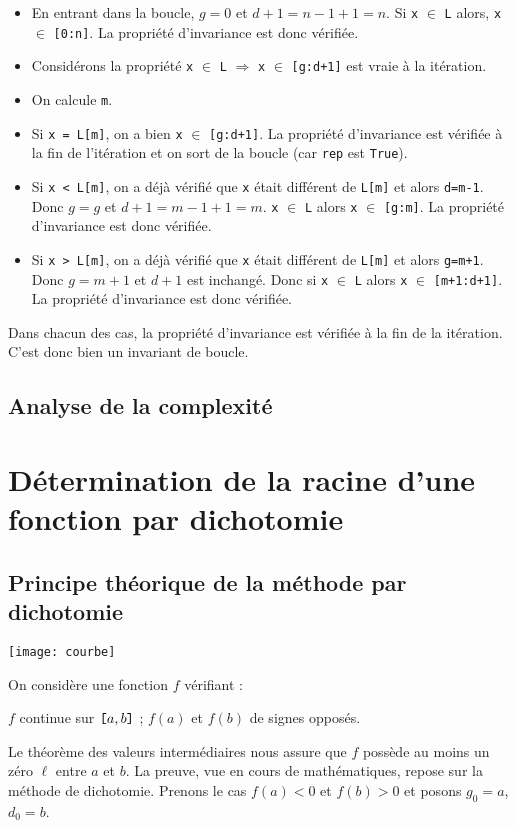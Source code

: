 \begin{itemize}
\item En entrant dans la boucle, $g=0$ et $d+1=n-1+1=n$. Si \lstinline{x} $\in$ \lstinline{L} alors, \lstinline{x} $\in$ \lstinline{[0:n]}. La propriété d'invariance est donc vérifiée.

\item Considérons la propriété 
\lstinline{x} $\in$ \lstinline{L} $\Rightarrow$ \lstinline{x} $\in$ \lstinline{[g:d+1]}
est vraie à la \ieme itération.

\item On calcule \lstinline{m}.

\item Si \lstinline{x = L[m]}, on a bien \lstinline{x} $\in$ \lstinline{[g:d+1]}. La propriété d'invariance est vérifiée à la fin de l'itération et on sort de la boucle (car \lstinline{rep} est \lstinline{True}). 

\item Si \lstinline{x < L[m]}, on a déjà vérifié que \lstinline{x} était différent de \lstinline{L[m]} et alors \lstinline{d=m-1}. Donc $g=g$ et $d+1=m-1+1=m$.
\lstinline{x} $\in$ \lstinline{L} alors \lstinline{x} $\in$ \lstinline{[g:m]}. La propriété d'invariance est donc vérifiée.

\item Si \lstinline{x > L[m]}, on a déjà vérifié que \lstinline{x} était différent de \lstinline{L[m]} et alors \lstinline{g=m+1}. Donc $g=m+1$ et $d+1$ est inchangé.
 Donc si 
\lstinline{x} $\in$ \lstinline{L} alors \lstinline{x} $\in$ \lstinline{[m+1:d+1]}. La propriété d'invariance est donc vérifiée.
\end{itemize}
Dans chacun des cas, la propriété d'invariance est vérifiée à la fin de la \ieme itération. C'est donc bien un invariant de boucle. 

\subsection{Analyse de la complexité}

\section{Détermination de la racine d'une fonction par dichotomie}

\subsection{Principe théorique de la méthode par dichotomie}
%
\begin{marginfigure}
\texttt{[image: courbe]}
\end{marginfigure}
% 
On considère une fonction $f$ vérifiant : 
\begin{center} $f$ continue sur $\verb![!a,b\verb!]!$ ;  $f(a)$ et $f(b)$ de signes opposés.
\end{center} Le théorème des valeurs intermédiaires nous assure que $f$ possède au moins un zéro $\ell$ entre $a$ et $b$. La preuve, vue en cours de mathématiques, repose sur la méthode de dichotomie. Prenons le cas $f(a)<0$ et $f(b)>0$ et posons $g_0=a$, $d_0=b$. 


